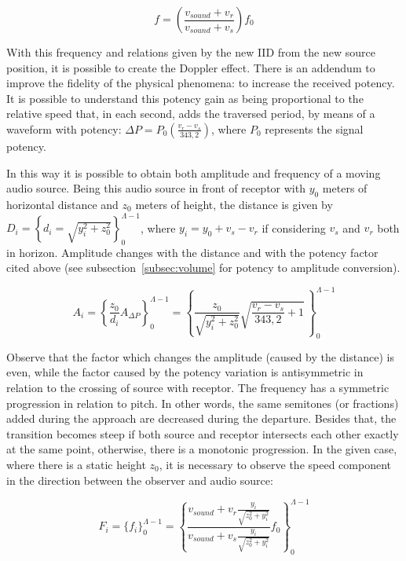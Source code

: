 \documentclass[
 aip,
 jmp,
 amsmath,amssymb,
 reprint,
]{revtex4-1}
\begin{document}
\begin{equation}\label{eq:fDoppler}
    f=\left(\frac{v_{sound}+v_r}{v_{sound}+v_s}\right)f_0
\end{equation}

With this frequency and relations given by the new IID from the new source
position, it is possible to create the Doppler effect. There is an addendum to
improve the fidelity of the physical phenomena: to increase the received
potency. It is possible to understand this potency gain as being proportional to the relative speed that, in each second, adds the traversed period, by means of a waveform with potency: $\Delta P=P_0\left(\frac{v_r-v_s}{343,2}\right)$, where $P_0$ represents the signal potency.

In this way it is possible to obtain both amplitude and frequency of a moving
audio source. Being this audio source in front of receptor with $y_0$ meters of horizontal distance and $z_0$ meters of height, the distance is given by
$D_i=\left\{ d_i=\sqrt{ y_{i}^{2}+z_{0}^{2} } \right\}_0^{\Lambda-1}$,
where $y_i=y_0+v_s-v_r$ if considering $v_s$ and $v_r$ both in
horizon. Amplitude changes with the distance and with the potency factor cited
above (see subsection~\ref{subsec:volume} for potency to amplitude conversion).

\begin{equation}\label{eq:aDoppler}
    A_i=\left\{ \frac{z_0}{d_i}A_{\Delta P}\right\}_0^{\Lambda-1} = \left\{ \frac{z_0}{\sqrt{y_i^2+z_0^2}} \sqrt{\frac{v_r-v_s}{343,2}+1}  \,\right\}_0^{\Lambda-1}
\end{equation}

Observe that the factor which changes the amplitude (caused by the distance) is even, while the factor caused by the potency variation is antisymmetric in
relation to the crossing of source with receptor. The frequency has a symmetric progression in relation to pitch. In other words, the same semitones (or fractions) added during the approach are decreased during the departure. Besides that, the transition becomes steep if both source and receptor intersects each other exactly at the same point, otherwise, there is a monotonic progression. In the given case, where there is a static height $z_0$, it is necessary to observe the speed component in the direction between the observer and audio source:

\begin{equation}\label{eq:ffDoppler}
    F_i=\{f_i\}_0^{\Lambda-1}=\left\{\frac{v_{sound} + v_r\frac{y_i}{\sqrt{z_0^2+y_i^2}}}{v_{sound}+v_s\frac{y_i}{\sqrt{z_0^2+y_i^2}}}f_0\right\}_0^{\Lambda-1}
\end{equation}
\end{document}
